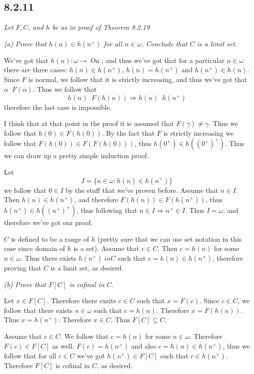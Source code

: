 \documentclass[11pt,oneside,titlepage]{book}
\DeclareMathOperator \ra {\Rightarrow}
\DeclareMathOperator \On {On}
\DeclareMathOperator \ineq {\underline{\in}}
\newcommand{\set}[1]{\{ #1 \}}
\begin{document}
\subsection*{8.2.11}

\textit{Let $F, C$, and $h$ be as in proof of Theorem 8.2.19}

\textit{(a) Prove that $h(n) \in h(n^+)$ for all $n \in \omega$. Conclude that $C$ is a
  limit set.}

We've got that $h(n): \omega \to \On$, and thus we've got that
for a particular $n \in \omega$ there are three cases:  $h(n) \in h(n^+)$,
$h(n) = h(n^+)$ and $h(n^+) \in h(n)$.
Since $F$ is normal, we follow that it is strictly increasing, and thus we've got that
$\alpha \ineq F(\alpha)$. Thus we follow that
$$h(n) \ineq F(h(n)) \ra h(n)  \ineq h(n^+)$$
therefore the last case is impossible.

I think that at that point in the proof it is assumed that $F(\gamma) \neq \gamma$.
Thus we follow that $h(0) \in F(h(0))$. By the fact that $F$ is strictly increasing
we follow that $F(h(0)) \in F(F(h(0)))$, thus $h(0^+) \in h((0^+)^+)$. Thus we can
draw up a pretty simple induction proof.

Let
$$I = \set{n \in \omega: h(n) \in h(n^+)}$$
we follow that $0 \in I$ by the stuff that we've proven before. Assume that $n \in I$.
Then $h(n) \in h(n^+)$, and therefore $F(h(n)) \in F(h(n^+))$, thus $h(n^+) \in h((n^+)^+)$,
thus following that $n \in I \ra n^+ \in I$. Thus $I = \omega$, and therefore we've got our
proof.

$C$ is defined to be a range of $h$ (pretty sure that we can use set notation in this case
since domain of $h$ is a set). Assume that $c \in C$. Then $c = h(n)$ for some $n \in \omega$.
Thus there exists $h(n^+) \ in C$ such that $c = h(n) \in h(n^+)$, therefore proving that
$C$ is a limit set, as desired.

\textit{(b) Prove that $F[C]$ is cofinal in $C$.}

Let $x \in F[C]$. Therefore there exsits $c \in C$ such that $x = F(c)$. Since
$c \in C$, we follow that there exists $n \in \omega$ such that $c = h(n)$.
Therefore $x = F(h(n))$. Thus $x = h(n^+)$. Therefore $x \in C$.
Thus $F[C] \subseteq C$.

Assume that $c \in C$. We follow that $c = h(n)$ for some $n \in \omega$. Therefore
$F(c) \in F[C]$ as well. $F(c) = h(n^+)$ and also $c = h(n) \in h(n^+)$,
thus we follow that for all $c \in C$ we've got $h(n^+) \in F[C]$ such that
$c \in h(n^+)$. Therefore $F[C]$ is cofinal in $C$, as desired.
\end{document}
